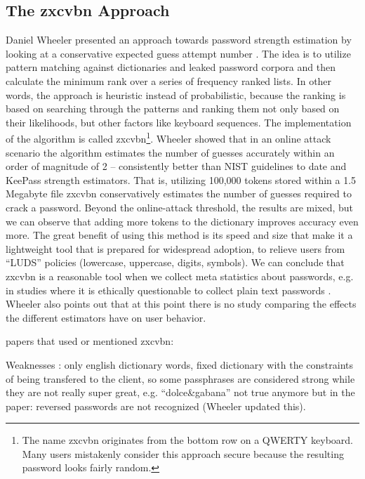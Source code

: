 	\subsection{The zxcvbn Approach}
Daniel Wheeler presented an approach towards password strength estimation by looking at a conservative expected guess attempt number \cite{Wheeler2016zxcvbn}. The idea is to utilize pattern matching against dictionaries and leaked password corpora and then calculate the minimum rank over a series of frequency ranked lists. In other words, the approach is heuristic instead of probabilistic, because the ranking is based on searching through the patterns and ranking them not only based on their likelihoods, but other factors like keyboard sequences. The implementation of the algorithm is called zxcvbn\footnote{The name zxcvbn originates from the bottom row on a QWERTY keyboard. Many users mistakenly consider this approach secure because the resulting password looks fairly random.}. Wheeler showed that in an online attack scenario \cite{Florencio2014AdministratorsGuide} the algorithm estimates the number of guesses accurately within an order of magnitude of 2 -- consistently better than NIST guidelines to date and KeePass strength estimators. That is, utilizing 100,000 tokens stored within a 1.5 Megabyte file zxcvbn conservatively estimates the number of guesses required to crack a password. Beyond the online-attack threshold, the results are mixed, but we can observe that adding more tokens to the dictionary improves accuracy even more. The great benefit of using this method is its speed and size that make it a lightweight tool that is prepared for widespread adoption, to relieve users from ``LUDS'' policies (lowercase, uppercase, digits, symbols). We can conclude that zxcvbn is a reasonable tool when we collect meta statistics about passwords, e.g. in studies where it is ethically questionable to collect plain text passwords \cite{Seitz2016SuggestionsDecoy}. Wheeler also points out that at this point there is no study comparing the effects the different estimators have on user behavior. 

papers that used or mentioned zxcvbn:
\cite{Komanduri2014Telepathwords}
\cite{Wang2016fuzzyPWM}
\cite{Ur2017DataDrivenPWMeter}
\cite{Yang2016MnemonicSentenceBased}

Weaknesses \cite{DeCarnedeCarnavalet2015PasswordMeters}: only english dictionary words, fixed dictionary with the constraints of being transfered to the client, so some passphrases are considered strong while they are not really super great, e.g. ``dolce\&gabana''
not true anymore but in the paper: reversed passwords are not recognized (Wheeler updated this). 


